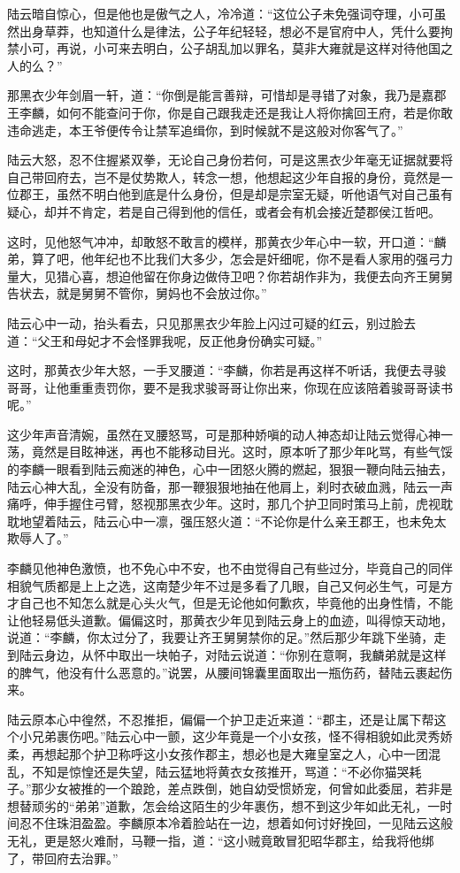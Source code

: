 陆云暗自惊心，但是他也是傲气之人，冷冷道：“这位公子未免强词夺理，小可虽然出身草莽，也知道什么是律法，公子年纪轻轻，想必不是官府中人，凭什么要拘禁小可，再说，小可来去明白，公子胡乱加以罪名，莫非大雍就是这样对待他国之人的么？”

那黑衣少年剑眉一轩，道：“你倒是能言善辩，可惜却是寻错了对象，我乃是嘉郡王李麟，如何不能查问于你，你是自己跟我走还是我让人将你擒回王府，若是你敢违命逃走，本王爷便传令让禁军追缉你，到时候就不是这般对你客气了。”

陆云大怒，忍不住握紧双拳，无论自己身份若何，可是这黑衣少年毫无证据就要将自己带回府去，岂不是仗势欺人，转念一想，他想起这少年自报的身份，竟然是一位郡王，虽然不明白他到底是什么身份，但是却是宗室无疑，听他语气对自己虽有疑心，却并不肯定，若是自己得到他的信任，或者会有机会接近楚郡侯江哲吧。

这时，见他怒气冲冲，却敢怒不敢言的模样，那黄衣少年心中一软，开口道：“麟弟，算了吧，他年纪也不比我们大多少，怎会是奸细呢，你不是看人家用的强弓力量大，见猎心喜，想迫他留在你身边做侍卫吧？你若胡作非为，我便去向齐王舅舅告状去，就是舅舅不管你，舅妈也不会放过你。”

陆云心中一动，抬头看去，只见那黑衣少年脸上闪过可疑的红云，别过脸去道：“父王和母妃才不会怪罪我呢，反正他身份确实可疑。”

这时，那黄衣少年大怒，一手叉腰道：“李麟，你若是再这样不听话，我便去寻骏哥哥，让他重重责罚你，要不是我求骏哥哥让你出来，你现在应该陪着骏哥哥读书呢。”

这少年声音清婉，虽然在叉腰怒骂，可是那种娇嗔的动人神态却让陆云觉得心神一荡，竟然是目眩神迷，再也不能移动目光。这时，原本听了那少年叱骂，有些气馁的李麟一眼看到陆云痴迷的神色，心中一团怒火腾的燃起，狠狠一鞭向陆云抽去，陆云心神大乱，全没有防备，那一鞭狠狠地抽在他肩上，刹时衣破血溅，陆云一声痛呼，伸手握住弓臂，怒视那黑衣少年。这时，那几个护卫同时策马上前，虎视耽耽地望着陆云，陆云心中一凛，强压怒火道：“不论你是什么亲王郡王，也未免太欺辱人了。”

李麟见他神色激愤，也不免心中不安，也不由觉得自己有些过分，毕竟自己的同伴相貌气质都是上上之选，这南楚少年不过是多看了几眼，自己又何必生气，可是方才自己也不知怎么就是心头火气，但是无论他如何歉疚，毕竟他的出身性情，不能让他轻易低头道歉。偏偏这时，那黄衣少年见到陆云身上的血迹，叫得惊天动地，说道：“李麟，你太过分了，我要让齐王舅舅禁你的足。”然后那少年跳下坐骑，走到陆云身边，从怀中取出一块帕子，对陆云说道：“你别在意啊，我麟弟就是这样的脾气，他没有什么恶意的。”说罢，从腰间锦囊里面取出一瓶伤药，替陆云裹起伤来。

陆云原本心中徨然，不忍推拒，偏偏一个护卫走近来道：“郡主，还是让属下帮这个小兄弟裹伤吧。”陆云心中一颤，这少年竟是一个小女孩，怪不得相貌如此灵秀娇柔，再想起那个护卫称呼这小女孩作郡主，想必也是大雍皇室之人，心中一团混乱，不知是惊惶还是失望，陆云猛地将黄衣女孩推开，骂道：“不必你猫哭耗子。”那少女被推的一个踉跄，差点跌倒，她自幼受惯娇宠，何曾如此委屈，若非是想替顽劣的“弟弟”道歉，怎会给这陌生的少年裹伤，想不到这少年如此无礼，一时间忍不住珠泪盈盈。李麟原本冷着脸站在一边，想着如何讨好挽回，一见陆云这般无礼，更是怒火难耐，马鞭一指，道：“这小贼竟敢冒犯昭华郡主，给我将他绑了，带回府去治罪。”

